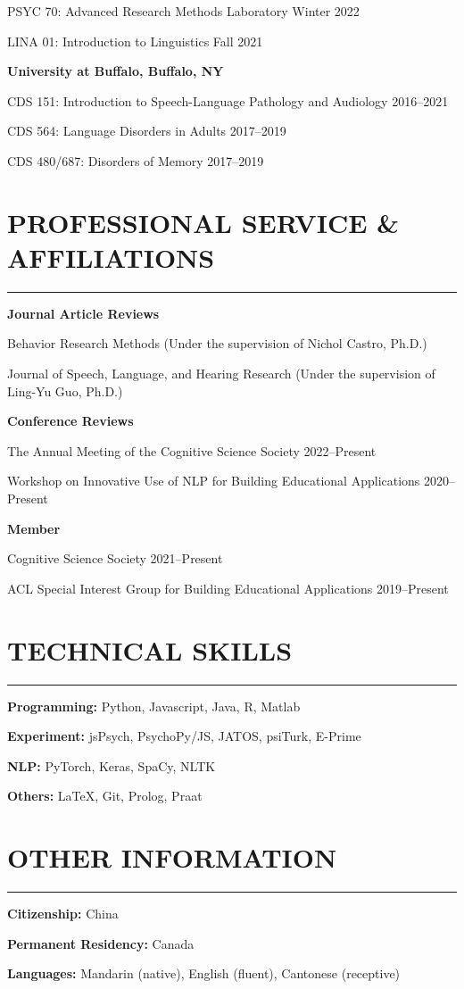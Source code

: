\documentclass[11pt]{article}
\newcommand{\cvsection}[1]{\vspace{-0.2cm}\section*{\Large #1}\vspace{-0.2cm}\hrule\vspace{0.2cm}}
\newcommand{\h}[1]{\hspace{15pt} #1}
\begin{document}
\h{PSYC 70: Advanced Research Methods Laboratory} \hfill Winter 2022

\h{LINA 01: Introduction to Linguistics} \hfill Fall 2021

\textbf{University at Buffalo, Buffalo, NY}

\h{CDS 151: Introduction to Speech-Language Pathology and Audiology} \hfill 2016--2021

\h{CDS 564: Language Disorders in Adults} \hfill 2017--2019

\h{CDS 480/687: Disorders of Memory} \hfill 2017--2019


\cvsection{PROFESSIONAL SERVICE \& AFFILIATIONS}

\textbf{Journal Article Reviews}

\h{Behavior Research Methods (Under the supervision of Nichol Castro, Ph.D.)}

\h{Journal of Speech, Language, and Hearing Research (Under the supervision of Ling-Yu Guo, Ph.D.)}

\textbf{Conference Reviews}

\h{The Annual Meeting of the Cognitive Science Society \hfill 2022--Present}

\h{Workshop on Innovative Use of NLP for Building Educational Applications \hfill 2020--Present}

\textbf{Member}

\h{Cognitive Science Society \hfill 2021--Present}

\h{ACL Special Interest Group for Building Educational Applications \hfill 2019--Present}



\cvsection{TECHNICAL SKILLS}

\textbf{Programming:} Python, Javascript, Java, R, Matlab

\textbf{Experiment:} jsPsych, PsychoPy/JS, JATOS, psiTurk, E-Prime

\textbf{NLP:} PyTorch, Keras, SpaCy, NLTK

\textbf{Others:} \LaTeX, Git, Prolog, Praat


\cvsection{OTHER INFORMATION}

\textbf{Citizenship:} China

\textbf{Permanent Residency:} Canada

\textbf{Languages:} Mandarin (native), English (fluent), Cantonese (receptive)


\newpage
\end{document}
